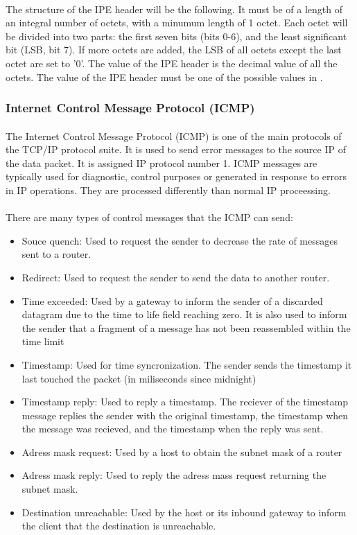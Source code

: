 \paragraph{}The structure of the IPE header will be the following. It must be of a length of an integral number of octets, with a minumum length of 1 octet. Each octet will be divided into two parts: the first seven bits (bits 0-6), and the least significant bit (LSB, bit 7). If more octets are added, the LSB of all octets except the last octet are set to '0'. The value of the IPE header is the decimal value of all the octets. The value of the IPE header must be one of the possible values in \cite{SANAIPE}.

\subsubsection*{Internet Control Message Protocol (ICMP)\cite{ICMP}}
\paragraph{}The Internet Control Message Protocol (ICMP) is one of the main protocols of the TCP/IP protocol suite. It is used to send error messages to the source IP of the data packet. It is assigned IP protocol number 1. ICMP messages are typically used for diagnostic, control purposes or generated in response to errors in IP operations. They are processed differently than normal IP proceessing.
\paragraph{}There are many types of control messages that the ICMP can send:
\begin{itemize}
\item Souce quench: Used to request the sender to decrease the rate of messages sent to a router.
\item Redirect: Used to request the sender to send the data to another router.
\item Time exceeded: Used by a gateway to inform the sender of a discarded datagram due to the time to life field reaching zero. It is also used to inform the sender that a fragment of a message has not been reassembled within the time limit
\item Timestamp: Used for time syncronization. The sender sends the timestamp it last touched the packet (in miliseconds since midnight)
\item Timestamp reply: Used to reply a timestamp. The reciever of the timestamp message replies the sender with the original timestamp, the timestamp when the message was recieved, and the timestamp when the reply was sent.
\item Adress mask request: Used by a host to obtain the subnet mask of a router
\item Adress mask reply: Used to reply the adress mass request returning the subnet mask.
\item Destination unreachable: Used by the host or its inbound gateway to inform the client that the destination is unreachable.
\end{itemize}


